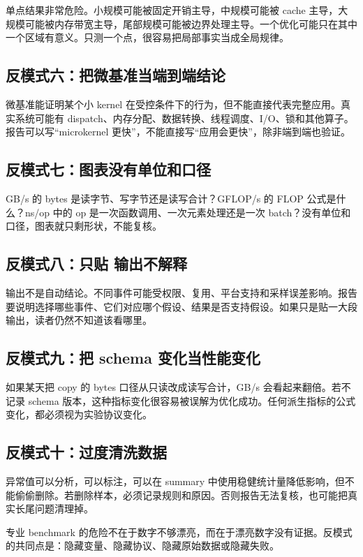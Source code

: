 单点结果非常危险。小规模可能被固定开销主导，中规模可能被 cache 主导，大规模可能被内存带宽主导，尾部规模可能被边界处理主导。一个优化可能只在其中一个区域有意义。只测一个点，很容易把局部事实当成全局规律。

\subsection{反模式六：把微基准当端到端结论}

微基准能证明某个小 kernel 在受控条件下的行为，但不能直接代表完整应用。真实系统可能有 dispatch、内存分配、数据转换、线程调度、I/O、锁和其他算子。报告可以写“microkernel 更快”，不能直接写“应用会更快”，除非端到端也验证。

\subsection{反模式七：图表没有单位和口径}

GB/s 的 bytes 是读字节、写字节还是读写合计？GFLOP/s 的 FLOP 公式是什么？ns/op 中的 op 是一次函数调用、一次元素处理还是一次 batch？没有单位和口径，图表就只剩形状，不能复核。

\subsection{反模式八：只贴  输出不解释}

 输出不是自动结论。不同事件可能受权限、复用、平台支持和采样误差影响。报告要说明选择哪些事件、它们对应哪个假设、结果是否支持假设。如果只是贴一大段输出，读者仍然不知道该看哪里。

\subsection{反模式九：把 schema 变化当性能变化}

如果某天把 copy 的 bytes 口径从只读改成读写合计，GB/s 会看起来翻倍。若不记录 schema 版本，这种指标变化很容易被误解为优化成功。任何派生指标的公式变化，都必须视为实验协议变化。

\subsection{反模式十：过度清洗数据}

异常值可以分析，可以标注，可以在 summary 中使用稳健统计量降低影响，但不能偷偷删除。若删除样本，必须记录规则和原因。否则报告无法复核，也可能把真实长尾问题清理掉。

\begin{warningbox}
专业 benchmark 的危险不在于数字不够漂亮，而在于漂亮数字没有证据。反模式的共同点是：隐藏变量、隐藏协议、隐藏原始数据或隐藏失败。
\end{warningbox}

